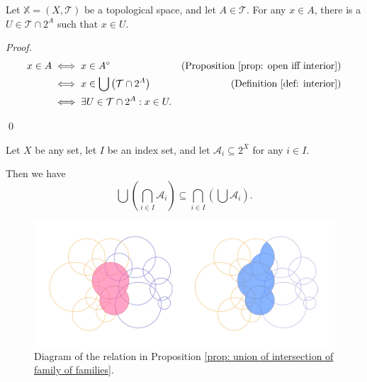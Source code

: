 \begin{proposition}
	\label{prop: point in open set}
	Let $\mathbb X = (X, \mathcal T)$ be a topological space, and let $A \in \mathcal T$. For any $x \in A$, there is a $U \in \mathcal T \cap 2^A$ such that $x \in U$.
	
	\begin{proof}
		$$
		\begin{aligned}
			x \in A &\iff x \in A^\circ
				&\text{(Proposition \ref{prop: open iff interior})} \\
			&\iff x \in \bigcup\left( \mathcal T \cap 2^A \right)
				&\text{(Definition \ref{def: interior})} \\
			&\iff \exists U \in \mathcal T \cap 2^A: x \in U.
		\end{aligned}
		$$
		
		\qed
	\end{proof}
\end{proposition}


\begin{proposition}
	\label{prop: union of intersection of family of families}
	Let $X$ be any set, let $I$ be an index set, and let $\mathcal A_i \subseteq 2^X$ for any $i \in I$.
	
	Then we have
	$$
	\bigcup \left( \bigcap_{i \in I} \mathcal A_i \right) \subseteq \bigcap_{i \in I} \left( \bigcup \mathcal A_i \right).
	$$
\end{proposition}


\begin{figure}[h]
	\centering
    \includegraphics[width=345pt]{notes-for-general-topology/media/intersection-of-family-of-families}
    \caption{Diagram of the relation in Proposition \ref{prop: union of intersection of family of families}.}
\end{figure}




